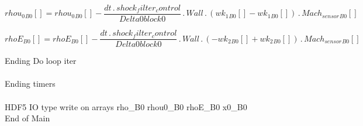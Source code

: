 \documentclass{article}
\begin{document}
\begin{dmath}{rhou_{0}{_{B0}}}[{}] = {rhou_{0}{_{B0}}}[{}] - \frac{dt \,.\, shock_filter_control}{Delta0block0} \,.\, Wall \,.\, \left({wk_{1}{_{B0}}}[{}] - {wk_{1}{_{B0}}}[{}]\right) \,.\, {Mach_{sensor}{_{B0}}}[{}]\end{dmath}

\begin{dmath}{rhoE{_{B0}}}[{}] = {rhoE{_{B0}}}[{}] - \frac{dt \,.\, shock_filter_control}{Delta0block0} \,.\, Wall \,.\, \left(- {wk_{2}{_{B0}}}[{}] + {wk_{2}{_{B0}}}[{}]\right) \,.\, {Mach_{sensor}{_{B0}}}[{}]\end{dmath}

\noindent Ending Do loop iter\\
\\\noindent Ending timers\\
\\\noindent HDF5 IO type write on arrays rho_B0 rhou0_B0 rhoE_B0 x0_B0\\\noindent End of Main\\
\end{document}
